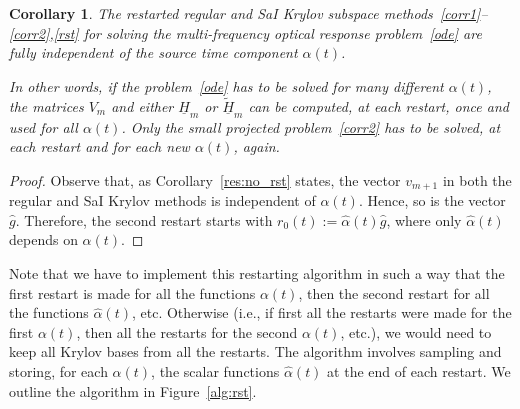 \documentclass[11pt]{elsarticle}
\newcommand{\alphah}{\widehat{\alpha}}
\newcommand{\gh}{\widehat{g}}
\newcommand{\Hh}{\underline{H}}
\newcommand{\Hht}{\underline{\tilde{H}}}
\newtheorem{coroll}{Corollary}
\begin{document}
\begin{coroll}
\label{res:rst}
The restarted regular and SaI Krylov subspace 
methods~\eqref{corr1}--\eqref{corr2},\eqref{rst}
for solving the multi-frequency optical response problem~\eqref{ode}
are fully independent of the source time component $\alpha(t)$.  

In other words, if the problem~\eqref{ode} has to be solved for
many different $\alpha(t)$, the matrices $V_m$ and either 
$\Hh_m$ or $\Hht_m$ can be computed, at each restart, once and 
used for all $\alpha(t)$.  Only the small projected 
problem~\eqref{corr2} has to be solved, at each restart and 
for each new $\alpha(t)$, again.  
\end{coroll}

\begin{proof}
Observe that, as Corollary~\ref{res:no_rst} states,
the vector $v_{m+1}$ in both the regular and SaI Krylov
methods is independent of $\alpha(t)$.  Hence, so is the
vector~$\gh$.  Therefore, the second restart starts 
with $r_0(t):=\alphah(t)\gh$, where only $\alphah(t)$
depends on $\alpha(t)$.
\end{proof}

Note that we have to implement this restarting algorithm 
in such a way that the first restart is made for all 
the functions $\alpha(t)$, then the second restart for all the 
functions $\alphah(t)$, etc.
Otherwise (i.e., if first all the restarts were made for the first $\alpha(t)$,
then all the restarts for the second $\alpha(t)$, etc.), we would 
need to keep all Krylov bases from all the restarts.
The algorithm involves sampling and storing, for each $\alpha(t)$, 
the scalar functions $\alphah(t)$ at the end of each restart.
We outline the algorithm in Figure~\ref{alg:rst}.
\end{document}
